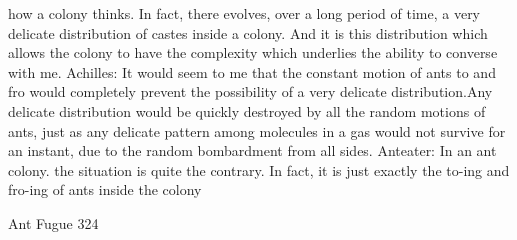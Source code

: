     how a colony thinks. In fact, there evolves, over a long period of time, a very delicate
    distribution of castes inside a colony. And it is this distribution which allows the
    colony to have the complexity which underlies the ability to converse with me.
Achilles: It would seem to me that the constant motion of ants to and fro would
    completely prevent the possibility of a very delicate distribution.Any delicate
    distribution would be quickly destroyed by all the random motions of ants, just as
    any delicate pattern among molecules in a gas would not survive for an instant, due
    to the random bombardment from all sides.
Anteater: In an ant colony. the situation is quite the contrary. In fact, it is just exactly the
    to-ing and fro-ing of ants inside the colony




Ant Fugue                                                                                  324

